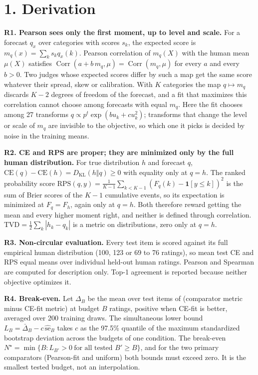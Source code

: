 \documentclass[10pt]{article}
\begin{document}
\section*{1. Derivation}
\textbf{R1. Pearson sees only the first moment, up to level and scale.} For a forecast $q_x$ over categories with scores $s_k$, the expected score is $m_q(x)=\sum_k s_k q_x(k)$. Pearson correlation of $m_q(X)$ with the human mean $\mu(X)$ satisfies $\operatorname{Corr}(a+b\,m_q,\mu)=\operatorname{Corr}(m_q,\mu)$ for every $a$ and every $b>0$. Two judges whose expected scores differ by such a map get the same score whatever their spread, skew or calibration. With $K$ categories the map $q\mapsto m_q$ discards $K-2$ degrees of freedom of the forecast, and a fit that maximizes this correlation cannot choose among forecasts with equal $m_q$. Here the fit chooses among 27 transforms $q\propto p^t\exp(bu_k+cu_k^2)$; transforms that change the level or scale of $m_q$ are invisible to the objective, so which one it picks is decided by noise in the training means.

\textbf{R2. CE and RPS are proper; they are minimized only by the full human distribution.} For true distribution $h$ and forecast $q$, $\mathrm{CE}(q)-\mathrm{CE}(h)=D_{\mathrm{KL}}(h\Vert q)\ge0$ with equality only at $q=h$. The ranked probability score $\mathrm{RPS}(q,y)=\frac1{K-1}\sum_{k<K-1}(F_q(k)-\mathbf 1[y\le k])^2$ is the sum of Brier scores of the $K-1$ cumulative events, so its expectation is minimized at $F_q=F_h$, again only at $q=h$. Both therefore reward getting the mean and every higher moment right, and neither is defined through correlation. TVD$=\tfrac12\sum_k|h_k-q_k|$ is a metric on distributions, zero only at $q=h$.

\textbf{R3. Non-circular evaluation.} Every test item is scored against its full empirical human distribution (100, 123 or 69 to 76 ratings), so mean test CE and RPS equal means over individual held-out human ratings. Pearson and Spearman are computed for description only. Top-1 agreement is reported because neither objective optimizes it.

\textbf{R4. Break-even.} Let $\Delta_B$ be the mean over test items of (comparator metric minus CE-fit metric) at budget $B$ ratings, positive when CE-fit is better, averaged over 200 training draws. The simultaneous lower bound $L_B=\bar\Delta_B-c\,\widehat{\mathrm{se}}_B$ takes $c$ as the 97.5\% quantile of the maximum standardized bootstrap deviation across the budgets of one condition. The break-even $N^\star=\min\{B: L_{B'}>0\ \text{for all tested } B'\ge B\}$, and for the two primary comparators (Pearson-fit and uniform) both bounds must exceed zero. It is the smallest tested budget, not an interpolation.
\end{document}
